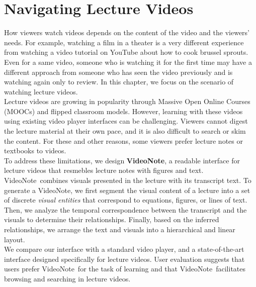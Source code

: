 \newcommand{\systemname}[0]{VideoNote}


\chapter{Navigating Lecture Videos} %

\label{ch:visualtranscript} %

How viewers watch videos depends on the content of the video and the viewers'
needs. For example, watching a film in a theater is a very different experience
from watching a video tutorial on YouTube about how to cook brussel sprouts.
Even for a same video, someone who is watching it for the first time may have a
different approach from someone who has seen the video previously and is
watching again only to review. In this chapter, we focus on the scenario of
watching lecture videos. \\

Lecture videos are growing in popularity through Massive Open Online Courses
(MOOCs) and flipped classroom models.
However, learning with these videos using existing video player interfaces can
be challenging. Viewers cannot digest the lecture material at their
own pace, and it is also difficult to search or skim the content. For these and other
reasons, some viewers prefer lecture notes or textbooks to videos.\\

To address these limitations, we design \textbf{\systemname}, a readable
interface for lecture videos that resmebles lecture notes with figures and text.
\systemname\ combines visuals presented in the lecture
with its transcript text. To generate a \systemname, we first segment the visual content
of a lecture into a set of discrete \emph{visual entities} that correspond to equations, figures, or lines of text. Then, we analyze
the temporal correspondence between the transcript and the visuals to determine their relationships. Finally, based on the inferred relationships, we arrange the text and visuals into a hierarchical and linear layout. \\

We compare our interface with a standard video player, and a state-of-the-art interface designed specifically for 
lecture videos. User evaluation suggests that users prefer \systemname\ for the task of learning and that \systemname\
facilitates browsing and searching in lecture videos.


